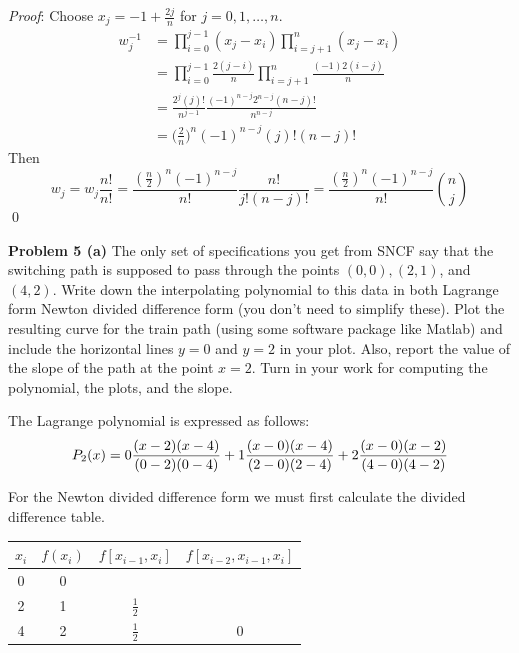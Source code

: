 \documentclass[12pt]{article}
\newcommand{\problem}[1]{\hspace{-4 ex} \large \textbf{Problem #1} }
\renewenvironment{proof}{\hspace{-4 ex} \emph{Proof}:}{\qed}
\begin{document}
	\begin{proof}
		Choose $x_j = -1 + \tfrac{2j}{n}$ for $j = 0, 1, \dots, n$.
		\begin{align*}
			w_j^{-1} & = \prod_{i=0}^{j-1}(x_j - x_i) \prod_{i=j+1}^{n}(x_j - x_i) \\
			& = \prod_{i=0}^{j-1} \frac{2(j-i)}{n} \prod_{i=j+1}^{n} \frac{(-1)2(i-j)}{n} \\
			& = \frac{ 2^{j} (j)!}{ n^{j-1}} \frac{(-1)^{n-j} 2^{n-j} (n-j)!}{ n^{n-j}} \\
			& = \big( \tfrac{2}{n} \big)^{n} (-1)^{n-j} (j)! (n-j)!
		\end{align*}
		Then
		$$
		w_j = w_j \frac{n!}{n!} = \frac{ (\tfrac{n}{2})^n (-1)^{n-j} }{ n! } \frac{n!}{j!(n-j)!} = \frac{ (\tfrac{n}{2})^n (-1)^{n-j} }{ n! }  {{n}\choose{j}}
		$$
	\end{proof}

\problem{5 (a)} The only set of specifications you get from SNCF say that the switching path is supposed
to pass through the points $(0, 0), (2, 1)$, and $(4, 2)$. Write down the interpolating polynomial
to this data in both Lagrange form Newton divided difference form (you don’t
need to simplify these). Plot the resulting curve for the train path (using some software
package like Matlab) and include the horizontal lines $y = 0$ and $y = 2$ in your plot.
Also, report the value of the slope of the path at the point $x = 2$. Turn in your work for
computing the polynomial, the plots, and the slope.

	The Lagrange polynomial is expressed as follows:
	$$
	P_2(x) = 0 \frac{ (x-2)(x-4) }{(0-2)(0-4) } + 1 \frac{ (x-0)(x-4) }{(2-0)(2-4) } + 2 \frac{ (x-0)(x-2) }{(4-0)(4-2) } \\
	$$

	For the Newton divided difference form we must first calculate the divided difference table.
	\begin{center}
		\begin{tabular}{|c|c|c|c|}\hline
			$x_i$ & $f(x_i)$ & $f[x_{i-1},x_i]$ & $f[x_{i-2}, x_{i-1}, x_i]$ \\ \hline
			0 &0 & & \\ \hline
			2 &1 & $\tfrac{1}{2}$ & \\ \hline
			4 &2 & $\tfrac{1}{2}$ & 0 \\ \hline
		\end{tabular}
	\end{center}
	
\end{document}
